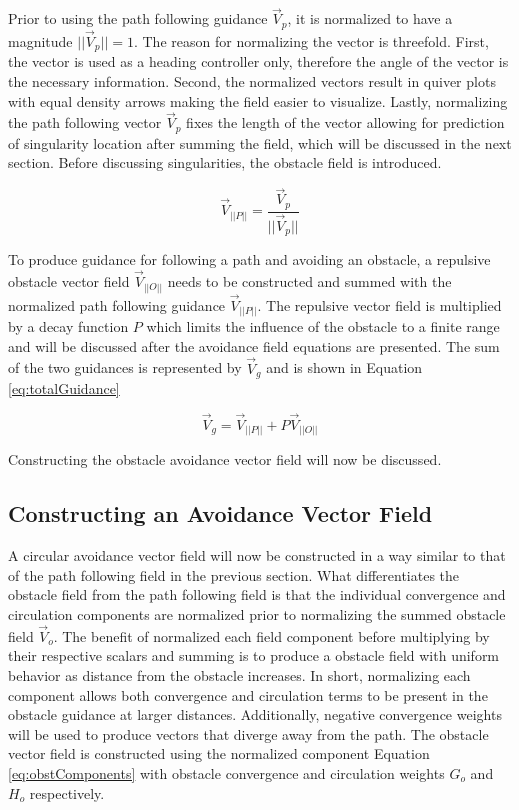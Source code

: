 \documentclass[numbered,pdftex]{ohio-etd}
\begin{document}
Prior to using the path following guidance $\overrightarrow{V}_p$, it is normalized to have a magnitude $||\overrightarrow{V}_p|| = 1$. The reason for normalizing the vector is threefold. First, the vector is used as a heading controller only, therefore the angle of the vector is the necessary information. Second, the normalized vectors result in quiver plots with equal density arrows making the field easier to visualize. Lastly, normalizing the path following vector $\overrightarrow{V}_p$ fixes the length of the vector allowing for prediction of singularity location after summing the field, which will be discussed in the next section. Before discussing singularities, the obstacle field is introduced. 


\begin{equation}
\overrightarrow{V}_{||P||} = \frac{\overrightarrow{V}_p}{||\overrightarrow{V}_p||}
\label{gonAllCompNormalized}
\end{equation}

To produce guidance for following a path and avoiding an obstacle, a repulsive obstacle vector field $\overrightarrow{V}_{||O||}$ needs to be constructed and summed with the normalized path following guidance $\overrightarrow{V}_{||P||}$. The repulsive vector field is multiplied by a decay function $P$ which limits the influence of the obstacle to a finite range and will be discussed after the avoidance field equations are presented. The sum of the two guidances is represented by $\overrightarrow{V}_g$ and is shown in Equation \ref{eq:totalGuidance}


\begin{equation}
\label{eq:totalGuidance}
\overrightarrow{V}_g = \overrightarrow{V}_{||P||} + P\overrightarrow{V}_{||O||}
\end{equation}

\noindent
Constructing the obstacle avoidance vector field will now be discussed.

\subsection{Constructing an Avoidance Vector Field}

A circular avoidance vector field will now be constructed in a way similar to that of the path following field in the previous section. What differentiates the obstacle field from the path following field is that the individual convergence and circulation components are normalized prior to normalizing the summed obstacle field $\overrightarrow{V}_o$. The benefit of normalized each field component before multiplying by their respective scalars and summing is to produce a obstacle field with uniform behavior as distance from the obstacle increases. In short, normalizing each component allows both convergence and circulation terms to be present in the obstacle guidance at larger distances. Additionally, negative convergence weights will be used to produce vectors that diverge away from the path. The obstacle vector field is constructed using the normalized component Equation \ref{eq:obstComponents} with obstacle convergence and circulation weights $G_o$ and $H_o$ respectively.
\end{document}
